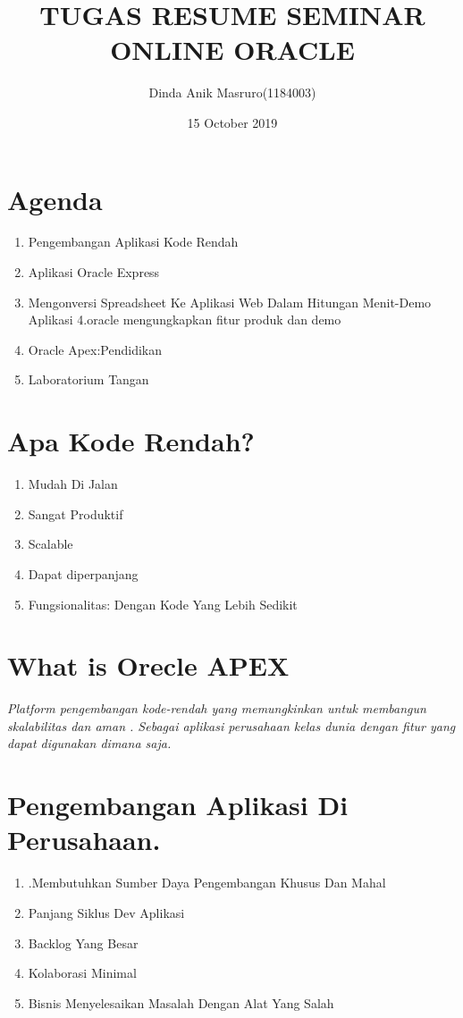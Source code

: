 \documentclass{article}
\title{TUGAS RESUME SEMINAR ONLINE ORACLE}
\author{Dinda Anik Masruro(1184003) }
\date{15 October 2019}
\begin{document}
\maketitle

\section{Agenda}
\begin{enumerate}
    \item Pengembangan Aplikasi Kode Rendah 
    \item Aplikasi Oracle Express
    \item Mengonversi Spreadsheet Ke Aplikasi Web Dalam Hitungan Menit-Demo Aplikasi 4.oracle mengungkapkan fitur produk dan demo
    \item Oracle Apex:Pendidikan
    \item Laboratorium Tangan
\end{enumerate}

\section{Apa Kode Rendah?}
\begin{enumerate}
    \item Mudah Di Jalan
    \item Sangat Produktif
    \item Scalable
    \item Dapat diperpanjang
    \item Fungsionalitas: Dengan Kode Yang Lebih Sedikit
\end{enumerate}
\section{What is Orecle APEX}
\textit{Platform pengembangan kode-rendah  yang memungkinkan untuk membangun skalabilitas dan aman . Sebagai aplikasi perusahaan kelas dunia dengan fitur yang dapat digunakan dimana saja.}
\section{Pengembangan Aplikasi Di Perusahaan.}
\begin{enumerate}

    \item .Membutuhkan Sumber Daya Pengembangan Khusus Dan Mahal
    \item Panjang Siklus Dev Aplikasi
    \item Backlog Yang Besar
    \item Kolaborasi Minimal
    \item Bisnis Menyelesaikan Masalah Dengan Alat Yang Salah
 
\end{enumerate}
\end{document}
